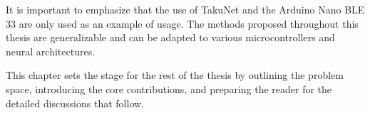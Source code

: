 It is important to emphasize that the use of TakuNet and the Arduino Nano BLE 33 are only used as an example of usage. The methods proposed throughout this thesis are generalizable and can be adapted to various microcontrollers and neural architectures.

This chapter sets the stage for the rest of the thesis by outlining the problem space, introducing the core contributions, and preparing the reader for the detailed discussions that follow.
